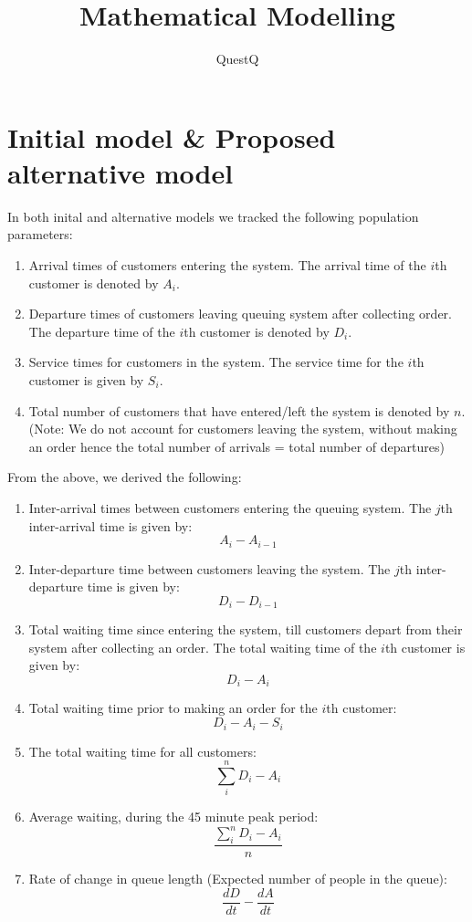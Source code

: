 \documentclass{article}
\begin{document}
\pagecolor{ultramarine}
\title{Mathematical Modelling}
\author{QuestQ}
\date{}
\maketitle
\section*{Initial model \& Proposed alternative model}
In both inital and alternative models we tracked the following population parameters:
\begin{enumerate}
    \item Arrival times of customers entering the system. The arrival time of the $i$th customer is denoted by $A_i$.
    \item Departure times of customers leaving queuing system after collecting order. The departure time of the $i$th customer is denoted by $D_i$.
    \item Service times for customers in the system. The service time for the $i$th customer is given by $S_i$.
    \item Total number of customers that have entered/left the system is denoted by $n$. (Note: We do not account for customers leaving the system, without making an order hence the total number of arrivals = total number of departures)
\end{enumerate}
From the above, we derived the following:
\begin{enumerate}
    \item Inter-arrival times between customers entering the queuing system. The $j$th inter-arrival time is given by: \[A_i-A_{i-1}\]
    \item Inter-departure time between customers leaving the system. The $j$th inter-departure time is given by: \[D_i-D_{i-1}\]
    \item Total waiting time since entering the system, till customers depart from their system after collecting an order. 
    The total waiting time of the $i$th customer is given by: \[D_i-A_i\]
    \item Total waiting time prior to making an order for the $i$th customer:
    \[D_i-A_i-S_i\]
    \item The total waiting time for all customers: \[\sum_i^n D_i-A_i\]
    \item Average waiting, during the 45 minute peak period:
    \[\frac{\sum_i^n D_i-A_i}{n}\]
    \item Rate of change in queue length (Expected number of people in the queue):
    \[\frac{dD}{dt}-\frac{dA}{dt}\]
\end{enumerate}
\end{document}
